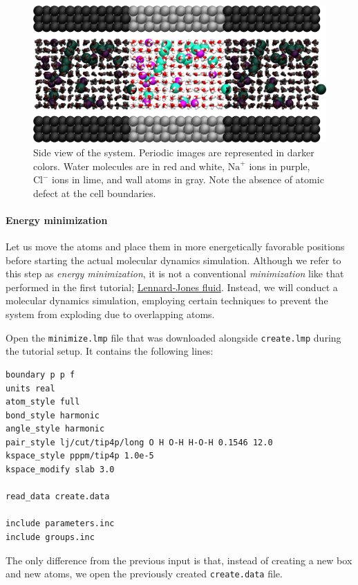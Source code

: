 \documentclass[9pt,tutorial]{livecoms}
\newcommand{\flecmd}[1]{\textcolor{command}{\texttt{#1}}} %
\begin{document}
\begin{figure}
\centering
\includegraphics[width=\linewidth]{NANOSHEAR-system}
\caption{Side view of the system.  Periodic images are represented in darker colors.
Water molecules are in red and white, $\text{Na}^+$ ions in purple, $\text{Cl}^-$
ions in lime, and wall atoms in gray.  Note the absence of atomic defect at the
cell boundaries.}
\label{fig:NANOSHEAR-system}
\end{figure}

\paragraph{Energy minimization}

Let us move the atoms and place them in more energetically favorable positions
before starting the actual molecular dynamics simulation.  Although we refer to this step as
\emph{energy minimization}, it is not a conventional \emph{minimization}
like that performed in the first tutorial; \hyperref[lennard-jones-label]{Lennard-Jones fluid}.
Instead, we will conduct a molecular dynamics simulation, employing certain techniques
to prevent the system from exploding due to overlapping atoms.

Open the \flecmd{minimize.lmp} file that was downloaded alongside
\flecmd{create.lmp} during the tutorial setup.  It contains the following lines:
\begin{lstlisting}
boundary p p f
units real
atom_style full
bond_style harmonic
angle_style harmonic
pair_style lj/cut/tip4p/long O H O-H H-O-H 0.1546 12.0
kspace_style pppm/tip4p 1.0e-5
kspace_modify slab 3.0
    
read_data create.data

include parameters.inc
include groups.inc
\end{lstlisting}
The only difference from the previous input is that, instead of creating a new
box and new atoms, we open the previously created \flecmd{create.data} file.
\end{document}
